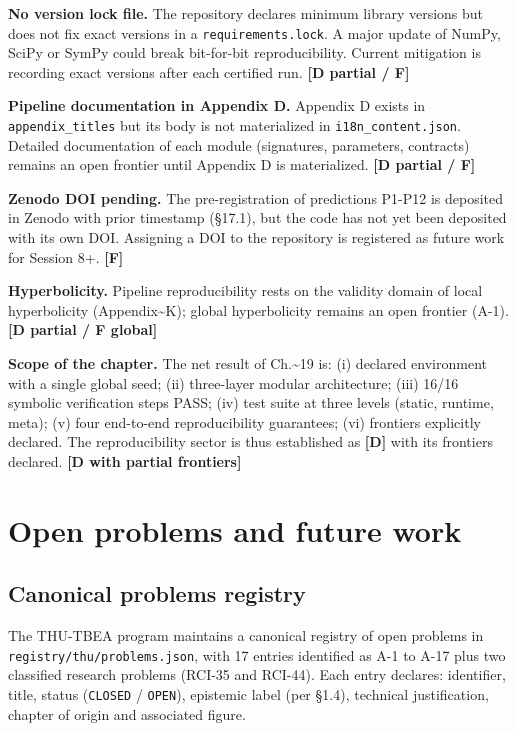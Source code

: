 ﻿\documentclass[11pt,letterpaper]{article}
\begin{document}
\textbf{No version lock file.} The repository declares minimum library versions but does not fix exact versions in a \texttt{requirements.lock}. A major update of NumPy, SciPy or SymPy could break bit-for-bit reproducibility. Current mitigation is recording exact versions after each certified run. \textbf{[D partial / F]}

\textbf{Pipeline documentation in Appendix D.} Appendix D exists in \texttt{appendix\_titles} but its body is not materialized in \texttt{i18n\_content.json}. Detailed documentation of each module (signatures, parameters, contracts) remains an open frontier until Appendix D is materialized. \textbf{[D partial / F]}

\textbf{Zenodo DOI pending.} The pre-registration of predictions P1-P12 is deposited in Zenodo with prior timestamp (§17.1), but the code has not yet been deposited with its own DOI. Assigning a DOI to the repository is registered as future work for Session 8+. \textbf{[F]}

\textbf{Hyperbolicity.} Pipeline reproducibility rests on the validity domain of local hyperbolicity (Appendix\textasciitilde{}K); global hyperbolicity remains an open frontier (A-1). \textbf{[D partial / F global]}

\textbf{Scope of the chapter.} The net result of Ch.\textasciitilde{}19 is: (i) declared environment with a single global seed; (ii) three-layer modular architecture; (iii) 16/16 symbolic verification steps PASS; (iv) test suite at three levels (static, runtime, meta); (v) four end-to-end reproducibility guarantees; (vi) frontiers explicitly declared. The reproducibility sector is thus established as \textbf{[D]} with its frontiers declared. \textbf{[D with partial frontiers]}

\section{Open problems and future work}
\subsection{Canonical problems registry}
The THU-TBEA program maintains a canonical registry of open problems in \texttt{registry/thu/problems.json}, with 17 entries identified as A-1 to A-17 plus two classified research problems (RCI-35 and RCI-44). Each entry declares: identifier, title, status (\texttt{CLOSED} / \texttt{OPEN}), epistemic label (per §1.4), technical justification, chapter of origin and associated figure.
\end{document}
